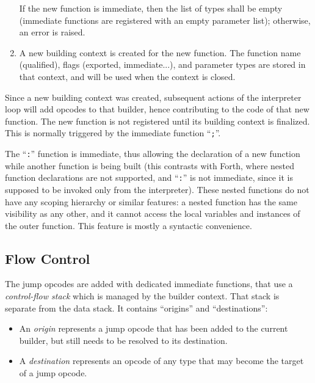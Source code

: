 \begin{enumerate}
    If the new function is immediate, then the list of types shall be
    empty (immediate functions are registered with an empty parameter
    list); otherwise, an error is raised.

    \item A new building context is created for the new function. The
    function name (qualified), flags (exported, immediate...), and
    parameter types are stored in that context, and will be used when
    the context is closed.

\end{enumerate}

Since a new building context was created, subsequent actions of the
interpreter loop will add opcodes to that builder, hence contributing to
the code of that new function. The new function is not registered until
its building context is finalized. This is normally triggered by the
immediate function ``\verb|;|''.

The ``\verb|:|'' function is immediate, thus allowing the declaration of
a new function while another function is being built (this contrasts
with Forth, where nested function declarations are not supported, and
``\verb|:|'' is not immediate, since it is supposed to be invoked only
from the interpreter). These nested functions do not have any scoping
hierarchy or similar features: a nested function has the same visibility
as any other, and it cannot access the local variables and instances of
the outer function. This feature is mostly a syntactic convenience.

\subsection{Flow Control}\label{syntax:flow}

The jump opcodes are added with dedicated immediate functions, that
use a \emph{control-flow stack} which is managed by the builder context.
That stack is separate from the data stack. It contains ``origins''
and ``destinations'':
\begin{itemize}

    \item An \emph{origin} represents a jump opcode that has been added
    to the current builder, but still needs to be resolved to its
    destination.

    \item A \emph{destination} represents an opcode of any type that may
    become the target of a jump opcode.

\end{itemize}

